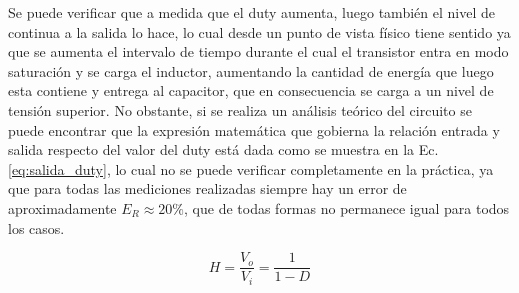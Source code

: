 Se puede verificar que a medida que el duty aumenta, luego tambi\'en el nivel de continua a la salida lo hace, lo cual desde un punto de vista f\'isico tiene sentido ya que se aumenta el intervalo de tiempo
durante el cual el transistor entra en modo saturaci\'on y se carga el inductor, aumentando la cantidad de energ\'ia que luego esta contiene y entrega al capacitor, que en consecuencia se carga a un nivel de tensi\'on superior.
No obstante, si se realiza un an\'alisis te\'orico del circuito se puede encontrar que la expresi\'on matem\'atica que gobierna la relaci\'on entrada y salida respecto del valor del duty est\'a dada como se muestra en la Ec. \ref{eq:salida_duty},
lo cual no se puede verificar completamente en la pr\'actica, ya que para todas las mediciones realizadas siempre hay un error de aproximadamente $E_R \approx 20\%$, que de todas formas no permanece igual para todos los casos.

\begin{equation}
    H = \frac{V_o}{V_i} = \frac{1}{1 - D}
    \label{eq:salida_duty}
\end{equation}

